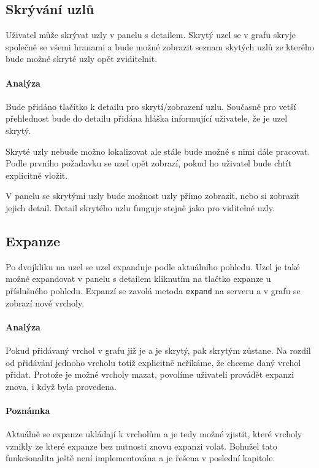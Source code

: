 \subsection{Skrývání uzlů}
Uživatel může skrývat uzly v panelu s detailem. Skrytý uzel se v grafu skryje společně se všemi hranami a bude možné zobrazit seznam skytých uzlů ze kterého bude možné skryté uzly opět zviditelnit.

\paragraph{Analýza} Bude přidáno tlačítko k detailu pro skrytí/zobrazení uzlu. Současně pro vetší přehlednost bude do detailu přidána hláška informující uživatele, že je uzel skrytý.

Skryté uzly nebude možno lokalizovat ale stále bude možné s nimi dále pracovat. Podle prvního požadavku se uzel opět zobrazí, pokud ho uživatel bude chtít explicitně vložit.

V panelu se skrytými uzly bude možnost uzly přímo zobrazit, nebo si zobrazit jejich detail. Detail skrytého uzlu funguje stejně jako pro viditelné uzly.

\subsection{Expanze}
Po dvojkliku na uzel se uzel expanduje podle aktuálního pohledu. Uzel je také možné expandovat v panelu s detailem kliknutím na tlačtko expanze u příslušného pohledu. Expanzí se zavolá metoda \texttt{expand} na serveru a v grafu se zobrazí nové vrcholy.

\paragraph{Analýza} Pokud přidávaný vrchol v grafu již je a je skrytý, pak skrytým zůstane. Na rozdíl od přidávání jednoho vrcholu totiž explicitně neříkáme, že chceme daný vrchol přidat. Protože je možné vrcholy mazat, povolíme uživateli provádět expanzi znova, i když byla provedena.

\paragraph{Poznámka} Aktuálně se expanze ukládají k vrcholům a je tedy možné zjistit, které vrcholy vznikly ze které expanze bez nutnosti znovu expanzi volat. Bohužel tato funkcionalita ještě není implementována a je řešena v poslední kapitole.

